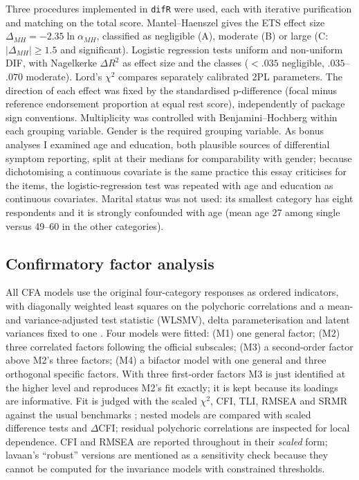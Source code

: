 \documentclass[11pt,a4paper]{article}
\begin{document}
Three procedures implemented in \texttt{difR} \citep{magis2010general} were used, each
with iterative purification and matching on the total score. Mantel--Haenszel gives the ETS effect size
$\Delta_{MH}=-2.35\ln\alpha_{MH}$, classified as negligible (A), moderate (B) or large
(C: $|\Delta_{MH}|\ge1.5$ and significant). Logistic
regression tests uniform and
non-uniform DIF, with Nagelkerke $\Delta R^2$ as effect size and the
\citet{jodoin2001evaluating} classes ($<.035$ negligible, $.035$--$.070$ moderate).
Lord's $\chi^2$ compares separately calibrated 2PL parameters. The direction of each
effect was fixed by the standardised p-difference (focal minus reference endorsement
proportion at equal rest score), independently of package sign conventions.
Multiplicity was controlled with Benjamini--Hochberg within each grouping variable.
Gender is the required grouping variable. As bonus analyses I examined age and
education, both plausible sources of differential symptom reporting, split at their
medians for comparability with gender; because dichotomising a continuous covariate
is the same practice this essay criticises for the items, the logistic-regression test
was repeated with age and education as continuous covariates. Marital status was not
used: its smallest category has eight respondents and it is strongly confounded with
age (mean age 27 among single versus 49--60 in the other categories).

\subsection{Confirmatory factor analysis}\label{sec:methods_cfa}

All CFA models use the original four-category responses as ordered indicators, with
diagonally weighted least squares on the polychoric correlations and a mean- and
variance-adjusted test statistic (WLSMV), delta parameterisation and latent variances
fixed to one \citep{muthen1984general,rosseel2012lavaan}. Four models
were fitted: (M1) one general factor; (M2) three correlated factors following the
official subscales; (M3) a second-order factor above M2's three factors; (M4) a
bifactor model with one general and three orthogonal specific factors. With three
first-order factors M3 is just identified at the higher level and reproduces M2's fit
exactly; it is kept because its loadings are informative. Fit is judged with the
scaled $\chi^2$, CFI, TLI, RMSEA and SRMR against the usual benchmarks
\citep{hu1999cutoff}; nested models are compared with scaled difference tests and $\Delta$CFI; residual polychoric correlations are inspected for local
dependence. CFI and RMSEA are reported throughout in their
\emph{scaled} form; lavaan's ``robust'' versions are mentioned as a sensitivity check
because they cannot be computed for the invariance models with constrained thresholds.
\end{document}
